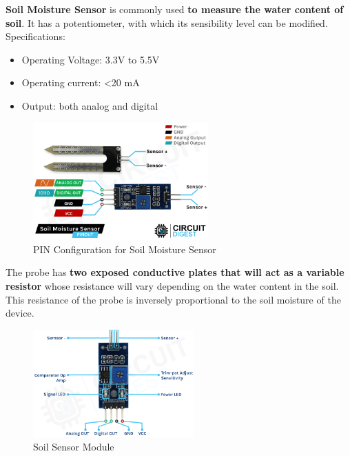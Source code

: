 \documentclass[12pt]{article}
\begin{document}
\textbf{Soil Moisture Sensor} is commonly used \textbf{to measure the water content of soil}. It has a potentiometer, with which its sensibility level can be modified.\\

\hspace{1cm}Specifications: 
\begin{itemize}[leftmargin=2cm]
    \item Operating Voltage: 3.3V to 5.5V
    \item Operating current: <20 mA
    \item Output: both analog and digital
\end{itemize}

\begin{figure}[ht]
    \centering
    \includegraphics[width=0.6\textwidth]{images/image16.png}
    \caption{PIN Configuration for Soil Moisture Sensor}
    \label{fig:pic10}
\end{figure} 

\newpage
The probe has \textbf{two exposed conductive plates that will act as a variable resistor} whose resistance will vary depending on the water content in the soil. This resistance of the probe is inversely proportional to the soil moisture of the device.

\begin{figure}[ht]
    \centering
    \includegraphics[width=0.55\textwidth]{images/image15.png}
    \caption{Soil Sensor Module}
    \label{fig:pic11}
\end{figure} 
\end{document}
